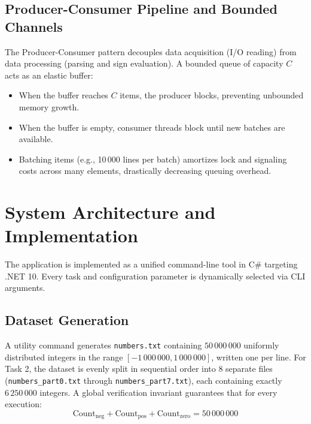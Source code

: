 \documentclass[12pt,a4paper]{article}
\begin{document}
\subsection{Producer-Consumer Pipeline and Bounded Channels}
The Producer-Consumer pattern decouples data acquisition (I/O reading) from data processing (parsing and sign evaluation). 
A bounded queue of capacity $C$ acts as an elastic buffer:
\begin{itemize}
    \item When the buffer reaches $C$ items, the producer blocks, preventing unbounded memory growth.
    \item When the buffer is empty, consumer threads block until new batches are available.
    \item Batching items (e.g., 10\,000 lines per batch) amortizes lock and signaling costs across many elements, drastically decreasing queuing overhead.
\end{itemize}

\section{System Architecture and Implementation}

The application is implemented as a unified command-line tool in C\# targeting .NET 10. Every task and configuration parameter is dynamically selected via CLI arguments.

\subsection{Dataset Generation}
A utility command generates \texttt{numbers.txt} containing $50\,000\,000$ uniformly distributed integers in the range $[-1\,000\,000, 1\,000\,000]$, written one per line. For Task 2, the dataset is evenly split in sequential order into 8 separate files (\texttt{numbers\_part0.txt} through \texttt{numbers\_part7.txt}), each containing exactly $6\,250\,000$ integers.
A global verification invariant guarantees that for every execution:
\begin{equation}
    \text{Count}_{\text{neg}} + \text{Count}_{\text{pos}} + \text{Count}_{\text{zero}} = 50\,000\,000
\end{equation}
\end{document}
